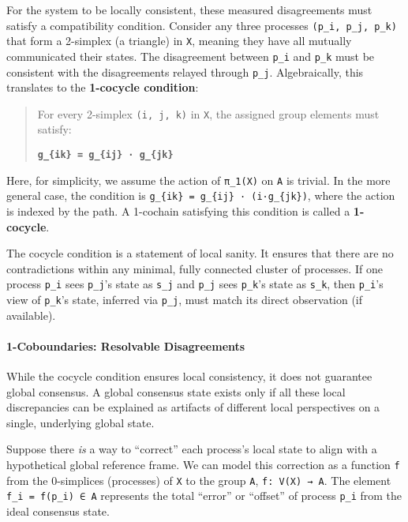 \documentclass[
]{article}
\begin{document}
For the system to be locally consistent, these measured disagreements
must satisfy a compatibility condition. Consider any three processes
\texttt{(p\_i,\ p\_j,\ p\_k)} that form a 2-simplex (a triangle) in
\texttt{X}, meaning they have all mutually communicated their states.
The disagreement between \texttt{p\_i} and \texttt{p\_k} must be
consistent with the disagreements relayed through \texttt{p\_j}.
Algebraically, this translates to the \textbf{1-cocycle condition}:

\begin{quote}
For every 2-simplex \texttt{(i,\ j,\ k)} in \texttt{X}, the assigned
group elements must satisfy:

\textbf{\texttt{g\_\{ik\}\ =\ g\_\{ij\}\ ·\ g\_\{jk\}}}
\end{quote}

Here, for simplicity, we assume the action of \texttt{π\_1(X)} on
\texttt{A} is trivial. In the more general case, the condition is
\texttt{g\_\{ik\}\ =\ g\_\{ij\}\ ·\ (i·g\_\{jk\})}, where the action is
indexed by the path. A 1-cochain satisfying this condition is called a
\textbf{1-cocycle}.

The cocycle condition is a statement of local sanity. It ensures that
there are no contradictions within any minimal, fully connected cluster
of processes. If one process \texttt{p\_i} sees \texttt{p\_j}'s state as
\texttt{s\_j} and \texttt{p\_j} sees \texttt{p\_k}'s state as
\texttt{s\_k}, then \texttt{p\_i}'s view of \texttt{p\_k}'s state,
inferred via \texttt{p\_j}, must match its direct observation (if
available).

\paragraph{1-Coboundaries: Resolvable
Disagreements}\label{coboundaries-resolvable-disagreements}

While the cocycle condition ensures local consistency, it does not
guarantee global consensus. A global consensus state exists only if all
these local discrepancies can be explained as artifacts of different
local perspectives on a single, underlying global state.

Suppose there \emph{is} a way to ``correct'' each process's local state
to align with a hypothetical global reference frame. We can model this
correction as a function \texttt{f} from the 0-simplices (processes) of
\texttt{X} to the group \texttt{A}, \texttt{f:\ V(X)\ →\ A}. The element
\texttt{f\_i\ =\ f(p\_i)\ ∈\ A} represents the total ``error'' or
``offset'' of process \texttt{p\_i} from the ideal consensus state.
\end{document}
